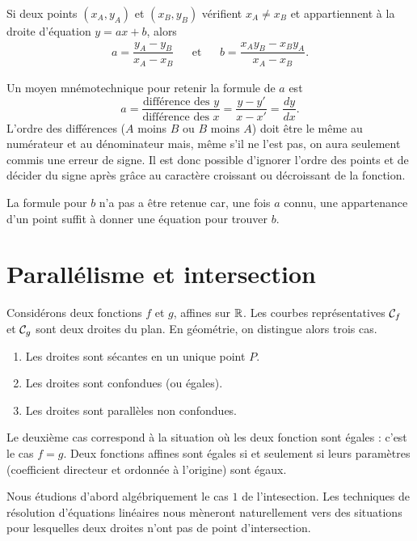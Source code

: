 \documentclass[a4paper, 12pt]{report}
\begin{document}
\begin{thm}
	Si deux points $(x_A, y_A)$ et $(x_B, y_B)$ vérifient $x_A\neq x_B$ et appartiennent à la droite d'équation $y=ax+b$, alors
		\begin{align*}
			a = \dfrac{y_A - y_B}{x_A - x_B} && \text{et} && b = \dfrac{x_A y_B - x_B y_A}{x_A-x_B}. 
		\end{align*}
\end{thm}

\begin{rmq}
	Un moyen mnémotechnique pour retenir la formule de $a$ est
		\[ a = \dfrac{\text{différence des $y$}}{\text{différence des $x$}} = \dfrac{y-y'}{x-x'} = \dfrac{dy}{dx}. \]
	L'ordre des différences ($A$ moins $B$ ou $B$ moins $A$) doit être le même au numérateur et au dénominateur mais, même s'il ne l'est pas, on aura seulement commis une erreur de signe.
	Il est donc possible d'ignorer l'ordre des points et de décider du signe après grâce au caractère croissant ou décroissant de la fonction.
	
	La formule pour $b$ n'a pas a être retenue car, une fois $a$ connu, une appartenance d'un point suffit à donner une équation pour trouver $b$.
\end{rmq}

\section{Parallélisme et intersection}

Considérons deux fonctions $f$ et $g$, affines sur $\mathbb{R}$.
Les courbes représentatives $\mathcal{C}_f$ et $\mathcal{C}_g$ sont deux droites du plan.
En géométrie, on distingue alors trois cas.
	\begin{enumerate}
		\item Les droites sont sécantes en un unique point $P$.
		\item Les droites sont confondues (ou égales).
		\item Les droites sont parallèles non confondues.
	\end{enumerate}
Le deuxième cas correspond à la situation où les deux fonction sont égales : c'est le cas $f=g$.
Deux fonctions affines sont égales si et seulement si leurs paramètres (coefficient directeur et ordonnée à l'origine) sont égaux.

Nous étudions d'abord algébriquement le cas $1$ de l'intesection.
Les techniques de résolution d'équations linéaires nous mèneront naturellement vers des situations pour lesquelles deux droites n'ont pas de point d'intersection.
\end{document}
